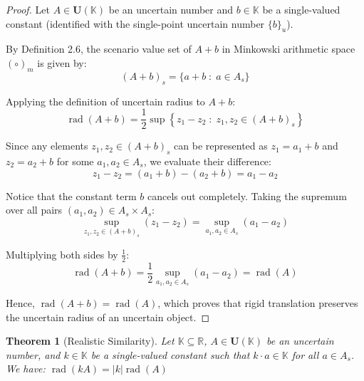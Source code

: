 \documentclass[a4paper,12pt,twoside]{memoir}
\newtheorem{theorem}{Theorem}[chapter]
\DeclareMathOperator{\rad}{rad}
\newcommand{\set}[1]{\left\{#1\right\}} %
\newcommand{\tsbd}[1]{\mathbf{U}(\mathbb{#1})}
\begin{document}
	\begin{proof}
		Let $A \in \tsbd{K}$ be an uncertain number and $b \in \mathbb{K}$ be a single-valued constant (identified with the single-point uncertain number $\{b\}_u$).
		
		By Definition 2.6, the scenario value set of $A + b$ in Minkowski arithmetic space $(\circ)_m$ is given by:
		\[
		(A + b)_s = \{a + b \;:\; a \in A_s\}
		\]
		
		Applying the definition of uncertain radius to $A + b$:
		\[
		\rad(A + b) = \frac{1}{2} \sup \set{z_1 - z_2 \;:\; z_1, z_2 \in (A + b)_s}
		\]
		
		Since any elements $z_1, z_2 \in (A + b)_s$ can be represented as $z_1 = a_1 + b$ and $z_2 = a_2 + b$ for some $a_1, a_2 \in A_s$, we evaluate their difference:
		\[
		z_1 - z_2 = (a_1 + b) - (a_2 + b) = a_1 - a_2
		\]
		
		Notice that the constant term $b$ cancels out completely. Taking the supremum over all pairs $(a_1, a_2) \in A_s \times A_s$:
		\[
		\sup_{z_1, z_2 \in (A + b)_s} (z_1 - z_2) = \sup_{a_1, a_2 \in A_s} (a_1 - a_2)
		\]
		
		Multiplying both sides by $\frac{1}{2}$:
		\[
		\rad(A + b) = \frac{1}{2} \sup_{a_1, a_2 \in A_s} (a_1 - a_2) = \rad(A)
		\]
		
		Hence, $\rad(A + b) = \rad(A)$, which proves that rigid translation preserves the uncertain radius of an uncertain object.
	\end{proof}
	\begin{theorem}[Realistic Similarity]
		Let $\mathbb{K} \subseteq \mathbb{R}$, $A \in \tsbd{K}$ be an uncertain number, and $k \in \mathbb{K}$ be a single-valued constant such that $k \cdot a \in \mathbb{K}$ for all $a \in A_s$. We have: $\rad(k A) = |k| \rad(A)$
	\end{theorem}
\end{document}
